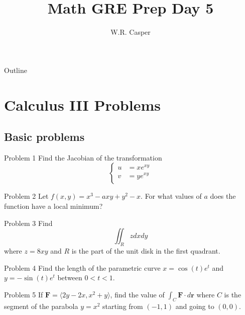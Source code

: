 \documentclass{beamer}
\title{Math GRE Prep Day 5}
\subtitle
{} %
\author[W.R. Casper] %
{W.R. Casper}
\institute[California State University Fullerton] %
{
  Department of Mathematics\\
  California State University Fullerton}
\begin{document}
\begin{frame}
  \titlepage
\end{frame}

\begin{frame}{Outline}
  \tableofcontents
\end{frame}



\section{Calculus III Problems}

\subsection{Basic problems}

\begin{frame}{Problem 1}
Find the Jacobian of the transformation 
$$\left\lbrace\begin{array}{cc}
u &= xe^{xy}\\
v &= ye^{xy}\\
\end{array}\right.$$
\end{frame}

\begin{frame}{Problem 2}
Let $f(x,y) = x^3-axy+y^2-x$.
For what values of $a$ does the function have a local minimum?
\end{frame}

\begin{frame}{Problem 3}
Find $$\iint_R z dxdy$$ where $z=8xy$ and $R$ is the part of the unit disk in the first quadrant.
\end{frame}

\begin{frame}{Problem 4}
Find the length of the parametric curve $x = \cos(t)e^{t}$ and $y = -\sin(t)e^t$ between $0<t<1$.
\end{frame}

\begin{frame}{Problem 5}
If $\mathbf F = \langle 2y-2x,x^2+y\rangle$, find the value of $\int_C\mathbf{F}\cdot d\mathbf{r}$ where $C$ is the segment of the parabola $y=x^2$ starting from $(-1,1)$ and going to $(0,0)$.
\end{frame}
\end{document}
